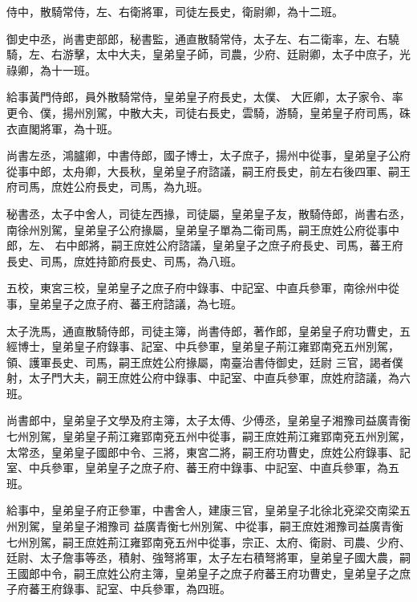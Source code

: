 \begin{pinyinscope}
 侍中，散騎常侍，左、右衛將軍，司徒左長史，衛尉卿，為十二班。



 御史中丞，尚書吏部郎，秘書監，通直散騎常侍，太子左、右二衛率，左、右驍騎，左、右游擊，太中大夫，皇弟皇子師，司農，少府、廷尉卿，太子中庶子，光祿卿，為十一班。



 給事黃門侍郎，員外散騎常侍，皇弟皇子府長史，太僕、
 大匠卿，太子家令、率更令、僕，揚州別駕，中散大夫，司徒右長史，雲騎，游騎，皇弟皇子府司馬，硃衣直閣將軍，為十班。



 尚書左丞，鴻臚卿，中書侍郎，國子博士，太子庶子，揚州中從事，皇弟皇子公府從事中郎，太舟卿，大長秋，皇弟皇子府諮議，嗣王府長史，前左右後四軍、嗣王府司馬，庶姓公府長史，司馬，為九班。



 秘書丞，太子中舍人，司徒左西掾，司徒屬，皇弟皇子友，散騎侍郎，尚書右丞，南徐州別駕，皇弟皇子公府掾屬，皇弟皇子單為二衛司馬，嗣王庶姓公府從事中郎，左、
 右中郎將，嗣王庶姓公府諮議，皇弟皇子之庶子府長史、司馬，蕃王府長史、司馬，庶姓持節府長史、司馬，為八班。



 五校，東宮三校，皇弟皇子之庶子府中錄事、中記室、中直兵參軍，南徐州中從事，皇弟皇子之庶子府、蕃王府諮議，為七班。



 太子洗馬，通直散騎侍郎，司徒主簿，尚書侍郎，著作郎，皇弟皇子府功曹史，五經博士，皇弟皇子府錄事、記室、中兵參軍，皇弟皇子荊江雍郢南兗五州別駕，領、護軍長史、司馬，嗣王庶姓公府掾屬，南臺治書侍御史，廷尉
 三官，謁者僕射，太子門大夫，嗣王庶姓公府中錄事、中記室、中直兵參軍，庶姓府諮議，為六班。



 尚書郎中，皇弟皇子文學及府主簿，太子太傅、少傅丞，皇弟皇子湘豫司益廣青衡七州別駕，皇弟皇子荊江雍郢南兗五州中從事，嗣王庶姓荊江雍郢南兗五州別駕，太常丞，皇弟皇子國郎中令、三將，東宮二將，嗣王府功曹史，庶姓公府錄事、記室、中兵參軍，皇弟皇子之庶子府、蕃王府中錄事、中記室、中直兵參軍，為五班。



 給事中，皇弟皇子府正參軍，中書舍人，建康三官，皇弟皇子北徐北兗梁交南梁五州別駕，皇弟皇子湘豫司
 益廣青衡七州別駕、中從事，嗣王庶姓湘豫司益廣青衡七州別駕，嗣王庶姓荊江雍郢南兗五州中從事，宗正、太府、衛尉、司農、少府、廷尉、太子詹事等丞，積射、強弩將軍，太子左右積弩將軍，皇弟皇子國大農，嗣王國郎中令，嗣王庶姓公府主簿，皇弟皇子之庶子府蕃王府功曹史，皇弟皇子之庶子府蕃王府錄事、記室、中兵參軍，為四班。




\end{pinyinscope}
